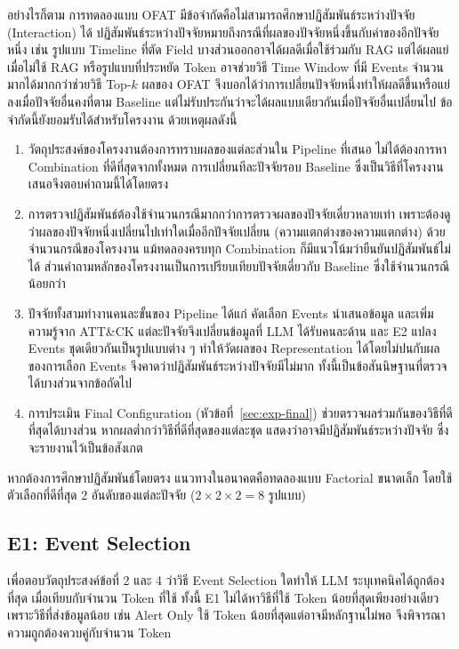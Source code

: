 อย่างไรก็ตาม การทดลองแบบ OFAT มีข้อจำกัดคือไม่สามารถศึกษาปฏิสัมพันธ์ระหว่างปัจจัย (Interaction) ได้
ปฏิสัมพันธ์ระหว่างปัจจัยหมายถึงกรณีที่ผลของปัจจัยหนึ่งขึ้นกับค่าของอีกปัจจัยหนึ่ง
เช่น รูปแบบ Timeline ที่ตัด Field บางส่วนออกอาจได้ผลดีเมื่อใช้ร่วมกับ RAG แต่ได้ผลแย่เมื่อไม่ใช้ RAG
หรือรูปแบบที่ประหยัด Token อาจช่วยวิธี Time Window ที่มี Events จำนวนมากได้มากกว่าช่วยวิธี Top-$k$
ผลของ OFAT จึงบอกได้ว่าการเปลี่ยนปัจจัยหนึ่งทำให้ผลดีขึ้นหรือแย่ลงเมื่อปัจจัยอื่นคงที่ตาม Baseline
แต่ไม่รับประกันว่าจะได้ผลแบบเดียวกันเมื่อปัจจัยอื่นเปลี่ยนไป
ข้อจำกัดนี้ยังยอมรับได้สำหรับโครงงาน ด้วยเหตุผลดังนี้
\begin{enumerate}
  \item วัตถุประสงค์ของโครงงานต้องการทราบผลของแต่ละส่วนใน Pipeline ที่เสนอ
        ไม่ได้ต้องการหา Combination ที่ดีที่สุดจากทั้งหมด การเปลี่ยนทีละปัจจัยรอบ Baseline
        ซึ่งเป็นวิธีที่โครงงานเสนอจึงตอบคำถามนี้ได้โดยตรง
  \item การตรวจปฏิสัมพันธ์ต้องใช้จำนวนกรณีมากกว่าการตรวจผลของปัจจัยเดี่ยวหลายเท่า
        เพราะต้องดูว่าผลของปัจจัยหนึ่งเปลี่ยนไปเท่าใดเมื่ออีกปัจจัยเปลี่ยน (ความแตกต่างของความแตกต่าง)
        ด้วยจำนวนกรณีของโครงงาน แม้ทดลองครบทุก Combination ก็มีแนวโน้มว่ายืนยันปฏิสัมพันธ์ไม่ได้
        ส่วนคำถามหลักของโครงงานเป็นการเปรียบเทียบปัจจัยเดี่ยวกับ Baseline ซึ่งใช้จำนวนกรณีน้อยกว่า
  \item ปัจจัยทั้งสามทำงานคนละขั้นของ Pipeline ได้แก่ คัดเลือก Events นำเสนอข้อมูล และเพิ่มความรู้จาก ATT\&CK
        แต่ละปัจจัยจึงเปลี่ยนข้อมูลที่ LLM ได้รับคนละด้าน และ E2 แปลง Events ชุดเดียวกันเป็นรูปแบบต่าง ๆ
        ทำให้วัดผลของ Representation ได้โดยไม่ปนกับผลของการเลือก Events
        จึงคาดว่าปฏิสัมพันธ์ระหว่างปัจจัยมีไม่มาก ทั้งนี้เป็นข้อสันนิษฐานที่ตรวจได้บางส่วนจากข้อถัดไป
  \item การประเมิน Final Configuration (หัวข้อที่~\ref{sec:exp-final}) ช่วยตรวจผลร่วมกันของวิธีที่ดีที่สุดได้บางส่วน
        หากผลต่ำกว่าวิธีที่ดีที่สุดของแต่ละชุด แสดงว่าอาจมีปฏิสัมพันธ์ระหว่างปัจจัย ซึ่งจะรายงานไว้เป็นข้อสังเกต
\end{enumerate}
หากต้องการศึกษาปฏิสัมพันธ์โดยตรง แนวทางในอนาคตคือทดลองแบบ Factorial ขนาดเล็ก
โดยใช้ตัวเลือกที่ดีที่สุด 2 อันดับของแต่ละปัจจัย ($2 \times 2 \times 2 = 8$ รูปแบบ)

\subsection{E1: Event Selection}
\label{sec:exp-e1}
เพื่อตอบวัตถุประสงค์ข้อที่ 2 และ 4 ว่าวิธี Event Selection ใดทำให้ LLM ระบุเทคนิคได้ถูกต้องที่สุด
เมื่อเทียบกับจำนวน Token ที่ใช้ ทั้งนี้ E1 ไม่ได้หาวิธีที่ใช้ Token น้อยที่สุดเพียงอย่างเดียว
เพราะวิธีที่ส่งข้อมูลน้อย เช่น Alert Only ใช้ Token น้อยที่สุดแต่อาจมีหลักฐานไม่พอ
จึงพิจารณาความถูกต้องควบคู่กับจำนวน Token

